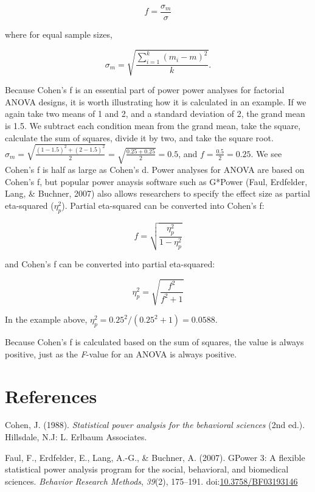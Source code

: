 \documentclass[,man,floatsintext]{apa6}
\begin{document}
\begin{equation}
f = \frac{\sigma _{ m }}{\sigma}
\end{equation}

where for equal sample sizes,

\begin{equation}
\sigma _{ m } = \sqrt { \frac { \sum_ { i = 1 } ^ { k } ( m _ { i } - m ) ^ { 2 } } { k } }.
\end{equation}

Because Cohen's f is an essential part of power power analyses for
factorial ANOVA designs, it is worth illustrating how it is calculated
in an example. If we again take two means of 1 and 2, and a standard
deviation of 2, the grand mean is 1.5. We subtract each condition mean
from the grand mean, take the square, calculate the sum of squares,
divide it by two, and take the square root.
\(\sigma_m = \sqrt{\frac{(1-1.5)^2+(2-1.5)^2}{2}} = \sqrt{\frac{0.25+0.25}{2}} = 0.5\),
and \(f = \frac{0.5}{2} = 0.25.\) We see Cohen's f is half as large as
Cohen's d. Power analyses for ANOVA are based on Cohen's f, but popular
power anaysis software such as G*Power (Faul, Erdfelder, Lang, \&
Buchner, 2007) also allows researchers to specify the effect size as
partial eta-squared (\(\eta_p^2\)). Partial eta-squared can be converted
into Cohen's f:

\begin{equation}
f = \sqrt{\frac{\eta_p^2}{1-\eta_p^2}}
\end{equation}

and Cohen's f can be converted into partial eta-squared:

\begin{equation}
\eta_p^2 = \sqrt{\frac{f^2}{f^2+1}}
\end{equation}

In the example above, \(\eta_p^2 = 0.25^2/(0.25^2+1) = 0.0588\).

Because Cohen's f is calculated based on the sum of squares, the value
is always positive, just as the \emph{F}-value for an ANOVA is always
positive.

\newpage

\section{References}\label{references}

\setlength{\parindent}{-0.5in} \setlength{\leftskip}{0.5in}

\hypertarget{refs}{}
\hypertarget{ref-cohen_statistical_1988}{}
Cohen, J. (1988). \emph{Statistical power analysis for the behavioral
sciences} (2nd ed.). Hillsdale, N.J: L. Erlbaum Associates.

\hypertarget{ref-faul_gpower_2007}{}
Faul, F., Erdfelder, E., Lang, A.-G., \& Buchner, A. (2007). GPower 3: A
flexible statistical power analysis program for the social, behavioral,
and biomedical sciences. \emph{Behavior Research Methods}, \emph{39}(2),
175--191.
doi:\href{https://doi.org/10.3758/BF03193146}{10.3758/BF03193146}
\end{document}
